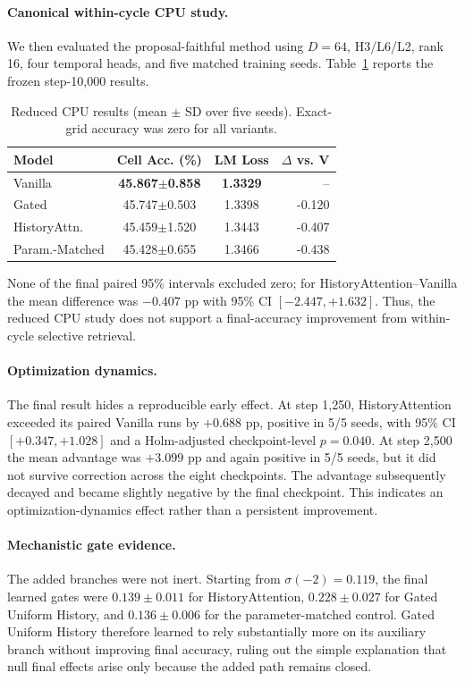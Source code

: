 \paragraph{Canonical within-cycle CPU study.}
We then evaluated the proposal-faithful method using
$D=64$, H3/L6/L2, rank 16, four temporal heads, and five matched training seeds.
Table~\ref{tab:cpu} reports the frozen step-10,000 results.

\begin{table}[t]
\centering
\small
\caption{Reduced CPU results (mean $\pm$ SD over five seeds). Exact-grid
accuracy was zero for all variants.}
\label{tab:cpu}
\begin{tabular}{lccr}
\toprule
Model & Cell Acc. (\%) & LM Loss & $\Delta$ vs. V \\
\midrule
Vanilla & \textbf{45.867$\pm$0.858} & \textbf{1.3329} & --\\
Gated & 45.747$\pm$0.503 & 1.3398 & -0.120\\
HistoryAttn. & 45.459$\pm$1.520 & 1.3443 & -0.407\\
Param.-Matched & 45.428$\pm$0.655 & 1.3466 & -0.438\\
\bottomrule
\end{tabular}
\end{table}

None of the final paired 95\% intervals excluded zero; for
HistoryAttention--Vanilla the mean difference was $-0.407$ pp with
95\% CI $[-2.447,+1.632]$. Thus, the reduced CPU study does not support a
final-accuracy improvement from within-cycle selective retrieval.

\paragraph{Optimization dynamics.}
The final result hides a reproducible early effect. At step 1,250,
HistoryAttention exceeded its paired Vanilla runs by $+0.688$ pp, positive in
5/5 seeds, with 95\% CI $[+0.347,+1.028]$ and a Holm-adjusted
checkpoint-level $p=0.040$. At step 2,500 the mean advantage was $+3.099$ pp
and again positive in 5/5 seeds, but it did not survive correction across the
eight checkpoints. The advantage subsequently decayed and became slightly
negative by the final checkpoint. This indicates an optimization-dynamics
effect rather than a persistent improvement.

\paragraph{Mechanistic gate evidence.}
The added branches were not inert. Starting from
$\sigma(-2)=0.119$, the final learned gates were
$0.139\pm0.011$ for HistoryAttention,
$0.228\pm0.027$ for Gated Uniform History, and
$0.136\pm0.006$ for the parameter-matched control. Gated Uniform History
therefore learned to rely substantially more on its auxiliary branch without
improving final accuracy, ruling out the simple explanation that null final
effects arise only because the added path remains closed.

